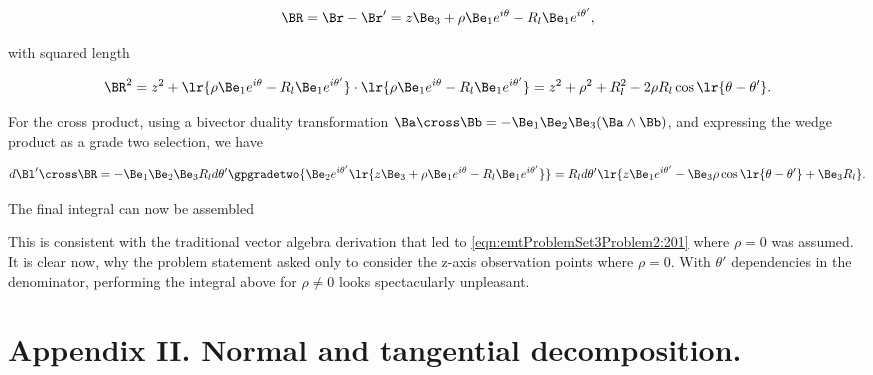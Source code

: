 \begin{dmath}\label{eqn:emtProblemSet3Problem2:120}
\BR 
= \Br - \Br'
=
z \Be_3 + \rho \Be_1 e^{i\theta}
-
R_l \Be_1 e^{i \theta'},
\end{dmath}

with squared length

\begin{dmath}\label{eqn:emtProblemSet3Problem2:140}
\BR^2 
=
z^2 + 
\lr{ \rho \Be_1 e^{i\theta}
-
R_l \Be_1 e^{i \theta'}
}
\cdot
\lr{ \rho \Be_1 e^{i\theta}
-
R_l \Be_1 e^{i \theta'}
}
=
z^2 + \rho^2 + R_l^2 - 2 \rho R_l \cos\lr{ \theta - \theta' }.
\end{dmath}

For the cross product, using a bivector duality transformation \( \Ba \cross \Bb = -\Be_1 \Be_2 \Be_3 (\Ba \wedge \Bb) \), and expressing the wedge product as a grade two selection, we have

\begin{dmath}\label{eqn:emtProblemSet3Problem2:180}
d\Bl' \cross \BR 
=
-\Be_1 \Be_2 \Be_3 R_l d\theta' \gpgradetwo{ 
\Be_2 e^{i \theta'} 
\lr{
z \Be_3 + \rho \Be_1 e^{i\theta}
-
R_l \Be_1 e^{i \theta'}
}
}
=
R_l d\theta' \lr{ 
z \Be_1 e^{i\theta'}
-
\Be_3 \rho \cos\lr{ \theta - \theta' }
+ \Be_3 R_l
}.
\end{dmath}

The final integral can now be assembled


This is consistent with the traditional vector algebra derivation that led to \cref{eqn:emtProblemSet3Problem2:201} where \( \rho = 0 \) was assumed.
It is clear now, why the problem statement asked only to consider the z-axis observation points where \( \rho = 0 \).  With \( \theta' \) dependencies in the denominator, performing the integral above for \( \rho \ne 0 \) looks spectacularly unpleasant.

\section{Appendix II.  Normal and tangential decomposition.}

